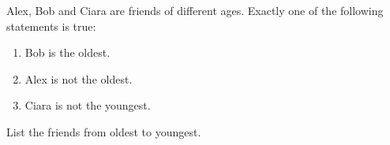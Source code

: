 Alex, Bob and Ciara are friends of different ages. Exactly one of the following statements is true:
\begin{enumerate}
\item[(I)] Bob is the oldest.
\item[(II)] Alex is not the oldest.
\item[(III)] Ciara is not the youngest.
\end{enumerate}
List the friends from oldest to youngest.

